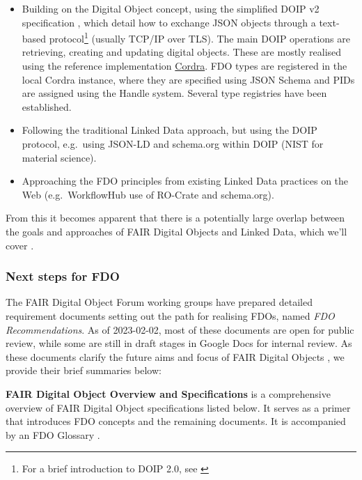 \begin{itemize}
\tightlist
\item
  Building on the Digital Object concept, using the simplified DOIP v2 specification \cite{foundationDigitalObjectInterface}, which detail how to exchange JSON objects through a text-based protocol\footnote{For a brief introduction to DOIP 2.0, see \cite{DOIPExamplesCordraa}} (usually TCP/IP over TLS). The main DOIP operations are retrieving, creating and updating digital objects. These are mostly realised using the reference implementation \href{https://cordra.org/}{Cordra}. FDO types are registered in the local Cordra instance, where they are specified using JSON Schema \cite{Draftbhuttonjsonschema00} and PIDs are assigned using the Handle system. Several type registries have been established.
\item
  Following the traditional Linked Data approach, but using the DOIP protocol, e.g.~using JSON-LD and schema.org within DOIP (NIST for material science).
\item
  Approaching the FDO principles from existing Linked Data practices on the Web (e.g.~WorkflowHub use of RO-Crate and schema.org).
\end{itemize}

From this it becomes apparent that there is a potentially large overlap between the goals and approaches of FAIR Digital Objects and Linked Data, which we'll cover .


\hypertarget{ch3:next-step-fdo}{%
\subsubsection{Next steps for FDO}\label{ch3:next-step-fdo}}

The FAIR Digital Object Forum \cite{FAIRDigitalObjects} working groups have prepared detailed requirement documents \cite{fdo-Specs} setting out the path for realising FDOs, named \emph{FDO Recommendations}. As of 2023-02-02, most of these documents are open for public review, while some are still in draft stages in Google Docs for internal review. As these documents clarify the future aims and focus of FAIR Digital Objects \cite{fdo-Roadmap}, we provide their brief summaries below:

\textbf{FAIR Digital Object Overview and Specifications} \cite{fdo-Overview} is a comprehensive overview of FAIR Digital Object specifications listed below. It serves as a primer that introduces FDO concepts and the remaining documents. It is accompanied by an FDO Glossary \cite{fdo-Glossary}.

